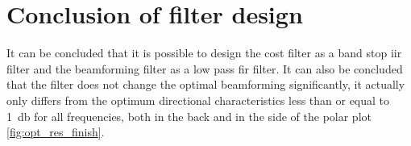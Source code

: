 \section{Conclusion of filter design}
It can be concluded that it is possible to design the cost filter as a band stop \gls{iir} filter and the beamforming filter as a low pass \gls{fir} filter. It can also be concluded that the filter does not change the optimal beamforming significantly, it actually only differs from the optimum directional characteristics less than or equal to \SI{1}{\decibel} for all frequencies, both in the back and in the side of the polar plot \autoref{fig:opt_res_finish}.





